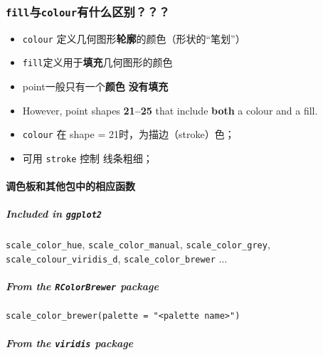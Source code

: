 \documentclass[
]{article}
\begin{document}
\hypertarget{fillux4e0ecolourux6709ux4ec0ux4e48ux533aux522b}{%
\subsubsection{\texorpdfstring{\texttt{fill}与\texttt{colour}有什么区别？？？}{fill与colour有什么区别？？？}}\label{fillux4e0ecolourux6709ux4ec0ux4e48ux533aux522b}}

\begin{itemize}
\item
  \texttt{colour} 定义几何图形\textbf{轮廓}的颜色（形状的``笔划''）
\end{itemize}

\begin{itemize}
\item
  \texttt{fill}定义用于\textbf{填充}几何图形的颜色
\item
  point一般只有一个\textbf{颜色} \textbf{没有填充}
\item
  However, point shapes \textbf{21--25} that include \textbf{both} a
  colour and a fill.
\item
  \texttt{colour} 在 shape = 21时，为描边（stroke）色；
\item
  可用 \texttt{stroke} 控制 线条粗细；
\end{itemize}

\hypertarget{ux8c03ux8272ux677fux548cux5176ux4ed6ux5305ux4e2dux7684ux76f8ux5e94ux51fdux6570}{%
\paragraph{调色板和其他包中的相应函数}\label{ux8c03ux8272ux677fux548cux5176ux4ed6ux5305ux4e2dux7684ux76f8ux5e94ux51fdux6570}}

\hypertarget{included-in-ggplot2}{%
\subparagraph{\texorpdfstring{Included in
\texttt{ggplot2}}{Included in ggplot2}}\label{included-in-ggplot2}}

\texttt{scale\_color\_hue}, \texttt{scale\_color\_manual},
\texttt{scale\_color\_grey}, \texttt{scale\_colour\_viridis\_d},
\texttt{scale\_color\_brewer} ...

\hypertarget{from-the-rcolorbrewer-package}{%
\subparagraph{\texorpdfstring{From the \texttt{RColorBrewer}
package}{From the RColorBrewer package}}\label{from-the-rcolorbrewer-package}}

\texttt{scale\_color\_brewer(palette\ =\ "\textless{}palette\ name\textgreater{}")}

\hypertarget{from-the-viridis-package}{%
\subparagraph{\texorpdfstring{From the \texttt{viridis}
package}{From the viridis package}}\label{from-the-viridis-package}}
\end{document}
